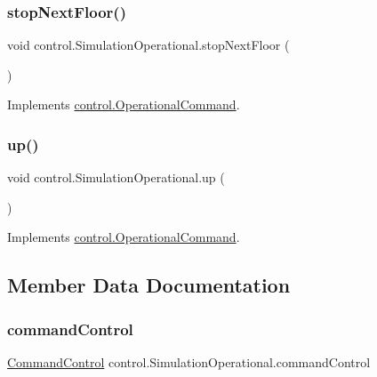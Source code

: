 \subsubsection{\texorpdfstring{stopNextFloor()}{stopNextFloor()}}
{\footnotesize\ttfamily void control.\+Simulation\+Operational.\+stop\+Next\+Floor (\begin{DoxyParamCaption}{ }\end{DoxyParamCaption})}



Implements \mbox{\hyperlink{interfacecontrol_1_1_operational_command_a148c09334384843727fb7b1665252ff1}{control.\+Operational\+Command}}.

\mbox{\label{classcontrol_1_1_simulation_operational_ab3ade4511703ee9715f82ce6e9a036a0}} 
\subsubsection{\texorpdfstring{up()}{up()}}
{\footnotesize\ttfamily void control.\+Simulation\+Operational.\+up (\begin{DoxyParamCaption}{ }\end{DoxyParamCaption})}



Implements \mbox{\hyperlink{interfacecontrol_1_1_operational_command_a23231ea40f8bf5cd07b864238f258b5f}{control.\+Operational\+Command}}.



\subsection{Member Data Documentation}
\mbox{\label{classcontrol_1_1_simulation_operational_a381628f543ab9b586023f718af9a279d}} 
\subsubsection{\texorpdfstring{commandControl}{commandControl}}
{\footnotesize\ttfamily \mbox{\hyperlink{interfacecontrol_1_1_command_control}{Command\+Control}} control.\+Simulation\+Operational.\+command\+Control\hspace{0.3cm}{\ttfamily [private]}}

